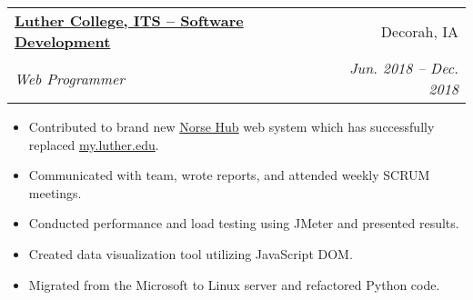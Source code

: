 \documentclass{article}
\makeatletter
\newcommand{\entry}[4]{
    \vspace{-1pt}
    \item
    \begin{tabular*}{0.98\textwidth}[t]{l@{\extracolsep{\fill}}r}
        \textbf{#1} & #2\\
        \textit{\small#3} & \textit{\small #4}\\
    \end{tabular*}\vspace{-4pt}
}
\newcommand{\entryitemsstart}{\begin{itemize}[label=\(\circ\)]}
\newcommand{\entryitemsend}{\end{itemize}\vspace{-4pt}}
\newcommand{\entryitem}[1]{\item\small{#1}}
\makeatother
\begin{document}
\entry{\href{https://www.luther.edu/its/}{Luther College, ITS -- Software Development}}{Decorah, IA}{Web Programmer}{Jun. 2018 -- Dec. 2018}
\entryitemsstart
    \entryitem{Contributed to brand new \href{https://norsehub.luther.edu/}{Norse Hub} web system which has successfully replaced \href{https://my.luther.edu/}{my.luther.edu}.}
    \entryitem{Communicated with team, wrote reports, and attended weekly SCRUM meetings.}
    \entryitem{Conducted performance and load testing using JMeter and presented results.}
    \entryitem{Created data visualization tool utilizing JavaScript DOM.}
    \entryitem{Migrated from the Microsoft to Linux server and refactored Python code.}
\entryitemsend



\end{document}
